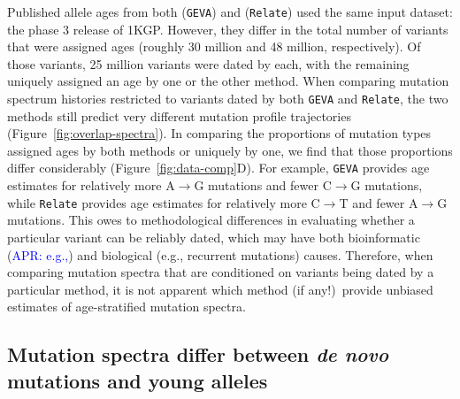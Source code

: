 \documentclass[]{article}
\newcommand{\aprcomment}[1]{{\textcolor{blue}{APR: #1}}}
\newcommand{\GEVA}{\texttt{GEVA}\xspace}
\newcommand{\relate}{\texttt{Relate}\xspace}
\begin{document}
Published allele ages from both \citet{albers2020dating} (\GEVA) and
\citet{speidel2019method} (\relate) used the same input dataset: the phase 3
release of 1KGP. However, they differ in the total number of variants that were
assigned ages (roughly 30 million and 48 million, respectively). Of those
variants, 25 million variants were dated by each, with the remaining uniquely
assigned an age by one or the other method. When comparing mutation spectrum
histories restricted to variants dated by both \GEVA and \relate, the two
methods still predict very different mutation profile trajectories
(Figure~\ref{fig:overlap-spectra}). In comparing the proportions of mutation
types assigned ages by both methods or uniquely by one, we find that those
proportions differ considerably (Figure~\ref{fig:data-comp}D). For example,
\GEVA provides age estimates for relatively more A$\rightarrow$G mutations and
fewer C$\rightarrow$G mutations, while \relate provides age estimates for
relatively more C$\rightarrow$T and fewer A$\rightarrow$G mutations. This owes
to methodological differences in evaluating whether a particular variant can be
reliably dated, which may have both bioinformatic (\aprcomment{e.g.,}) and
biological (e.g., recurrent mutations) causes.  Therefore, when comparing
mutation spectra that are conditioned on variants being dated by a particular
method, it is not apparent which method (if any!)\ provide unbiased estimates
of age-stratified mutation spectra.

\subsection*{Mutation spectra differ between \emph{de novo} mutations and young
alleles}
\end{document}
